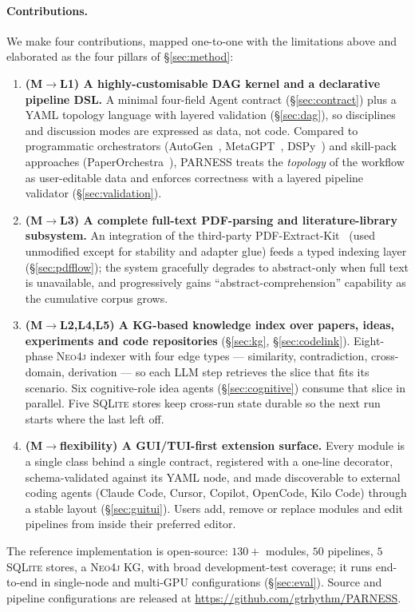\documentclass{article}
\newcommand{\parness}{\textsf{PARNESS}}
\begin{document}
\paragraph{Contributions.}
We make four contributions, mapped one-to-one with the limitations
above and elaborated as the four pillars of \S\ref{sec:method}:
\begin{enumerate}[leftmargin=1.4em,itemsep=0.2em]
\item \textbf{(M$\to$L1) A highly-customisable DAG kernel and a
declarative pipeline DSL.} A minimal four-field Agent contract
(\S\ref{sec:contract}) plus a YAML topology language with layered
validation (\S\ref{sec:dag}), so disciplines and discussion modes are
expressed as data, not code. Compared to programmatic orchestrators
(AutoGen~\cite{autogen}, MetaGPT~\cite{metagpt}, DSPy~\cite{dspy}) and
skill-pack approaches (PaperOrchestra~\cite{paperorchestra}), \parness{}
treats the \emph{topology} of the workflow as user-editable data and
enforces correctness with a layered pipeline validator
(\S\ref{sec:validation}).
\item \textbf{(M$\to$L3) A complete full-text PDF-parsing and
literature-library subsystem.} An integration of the third-party
PDF-Extract-Kit~\cite{pdfextractkit} (used unmodified except for
stability and adapter glue) feeds a typed indexing layer
(\S\ref{sec:pdfflow}); the system gracefully degrades to abstract-only
when full text is unavailable, and progressively gains
``abstract-comprehension'' capability as the cumulative corpus grows.
\item \textbf{(M$\to$L2,L4,L5) A KG-based knowledge index over
papers, ideas, experiments and code repositories} (\S\ref{sec:kg},
\S\ref{sec:codelink}). Eight-phase \textsc{Neo4j} indexer with four edge
types --- similarity, contradiction, cross-domain, derivation --- so
each LLM step retrieves the slice that fits its scenario. Six
cognitive-role idea agents (\S\ref{sec:cognitive}) consume that slice in
parallel. Five \textsc{SQLite} stores keep cross-run state durable so
the next run starts where the last left off.
\item \textbf{(M$\to$flexibility) A GUI/TUI-first extension surface.}
Every module is a single class behind a single contract, registered with
a one-line decorator, schema-validated against its YAML node, and made
discoverable to external coding agents (Claude Code, Cursor, Copilot,
OpenCode, Kilo Code) through a stable layout (\S\ref{sec:guitui}). Users
add, remove or replace modules and edit pipelines from inside their
preferred editor.
\end{enumerate}
The reference implementation is open-source: $130{+}$ modules, $50$
pipelines, $5$ \textsc{SQLite} stores, a \textsc{Neo4j} KG, with broad
development-test coverage; it runs end-to-end in single-node and
multi-GPU configurations (\S\ref{sec:eval}). Source and pipeline
configurations are released at
\url{https://github.com/gtrhythm/PARNESS}.
\end{document}
